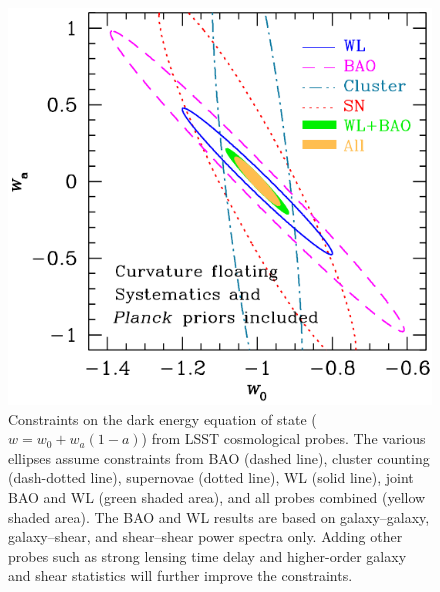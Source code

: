 \documentclass{emulateapj}
\begin{document}
\begin{figure}
\includegraphics[width=1.0\hsize,clip]{cswb.pdf}
\caption{
Constraints on the dark energy equation of state ($w = w_0 +
w_a(1-a)$) from LSST cosmological probes.  The various ellipses assume
constraints from BAO (dashed line), cluster counting (dash-dotted line), 
supernovae (dotted line), WL (solid line), joint BAO and WL 
(green shaded area), and all probes combined (yellow shaded area).
The BAO and WL results are based on galaxy--galaxy, galaxy--shear,
and shear--shear power spectra only. 
Adding other probes such as strong lensing time delay
and higher-order galaxy and shear statistics will further improve 
the constraints.} 
\label{Fig:DEellipses}
\end{figure}
\end{document}

